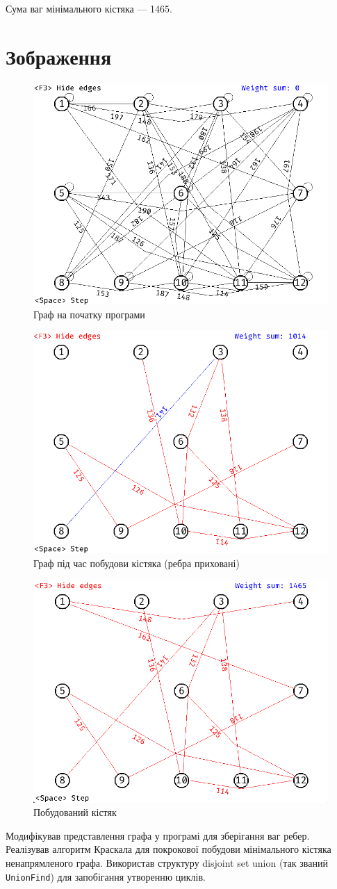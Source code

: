 Сума ваг мінімального кістяка --- 1465.

\section{Зображення}

\begin{figure}[ht!]
  \center\includegraphics[width=0.5\linewidth]{graph.png}
  \caption{Граф на початку програми}
\end{figure}
\begin{figure}[ht!]
  \center\includegraphics[width=0.5\linewidth]{in_progress.png}
  \caption{Граф під час побудови кістяка (ребра приховані)}
\end{figure}
\begin{figure}[ht!]
  \center\includegraphics[width=0.5\linewidth]{result.png}
  \caption{Побудований кістяк}
\end{figure}
\pagebreak

\conclusion%
Модифікував представлення графа у програмі для зберігання ваг ребер.\\
Реалізував алгоритм Краскала для покрокової побудови мінімального кістяка ненапрямленого графа.
Використав структуру disjoint set union (так званий\\
\texttt{UnionFind}) для запобігання утворенню циклів.




